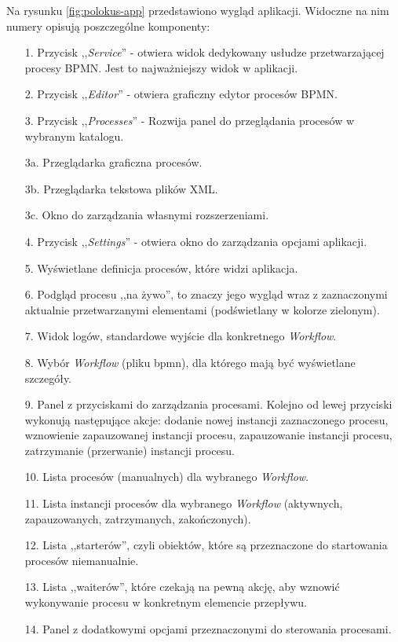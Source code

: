 \documentclass[declaration,shortabstract,mgr]{iithesis}
\begin{document}
Na rysunku \ref{fig:polokus-app} przedstawiono wygląd aplikacji. Widoczne na nim numery opisują poszczególne komponenty:
\begin{enumerate}
\setlength\itemsep{0em}
    \item[1.] Przycisk ,,\textit{Service}'' - otwiera widok dedykowany usłudze przetwarzającej procesy BPMN. Jest to najważniejszy widok w aplikacji.
    \item[2.] Przycisk ,,\textit{Editor}'' - otwiera graficzny edytor procesów BPMN.
    \item[3.] Przycisk ,,\textit{Processes}'' - Rozwija panel do przeglądania procesów w wybranym katalogu.
    \item[3a.] Przeglądarka graficzna procesów.
    \item[3b.] Przeglądarka tekstowa plików XML.
    \item[3c.] Okno do zarządzania własnymi rozszerzeniami.
    \item[4.] Przycisk ,,\textit{Settings}'' - otwiera okno do zarządzania opcjami aplikacji.
    \item[5.] Wyświetlane definicja procesów, które widzi aplikacja.
    \item[6.] Podgląd procesu ,,na żywo'', to znaczy jego wygląd wraz z zaznaczonymi aktualnie przetwarzanymi elementami (podświetlany w kolorze zielonym).
    \item[7.] Widok logów, standardowe wyjście dla konkretnego \textit{Workflow}.
    \item[8.] Wybór \textit{Workflow} (pliku bpmn), dla którego mają być wyświetlane szczegóły.
    \item[9.] Panel z przyciskami do zarządzania procesami. Kolejno od lewej przyciski wykonują następujące akcje: dodanie nowej instancji zaznaczonego procesu, wznowienie zapauzowanej instancji procesu, zapauzowanie instancji procesu, zatrzymanie (przerwanie) instancji procesu.
    \item[10.] Lista procesów (manualnych) dla wybranego \textit{Workflow}.
    \item[11.] Lista instancji procesów dla wybranego \textit{Workflow} (aktywnych, zapauzowanych, zatrzymanych, zakończonych).
    \item[12.] Lista ,,starterów'', czyli obiektów, które są przeznaczone do startowania procesów niemanualnie.
    \item[13.] Lista ,,waiterów'', które czekają na pewną akcję, aby wznowić wykonywanie procesu w konkretnym elemencie przepływu.
    \item[14.] Panel z dodatkowymi opcjami przeznaczonymi do sterowania procesami.
\end{enumerate}
\end{document}
